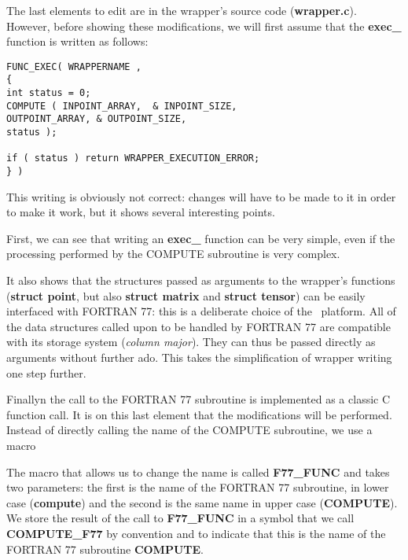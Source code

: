 The last elements to edit are in the wrapper's source code ({\bf wrapper.c}). However, before showing these modifications, we will first assume that the {\bf exec\_} function is written as follows:

\lstset{language=C++, basicstyle=\normalsize}
\begin{lstlisting}[frame=TBRL]
FUNC_EXEC( WRAPPERNAME ,
{
int status = 0;
COMPUTE ( INPOINT_ARRAY,  & INPOINT_SIZE,
OUTPOINT_ARRAY, & OUTPOINT_SIZE,
status );

if ( status ) return WRAPPER_EXECUTION_ERROR;
} )
\end{lstlisting}

This writing is obviously not correct: changes will have to be made to it in order to make it work, but it shows several interesting points.

First, we can see that writing an {\bf exec\_} function can be very simple, even if the processing performed by the COMPUTE subroutine is very complex.

It also shows that the structures passed as arguments to the wrapper's functions ({\bf struct point}, but also {\bf struct matrix} and {\bf struct tensor}) can be easily interfaced with FORTRAN 77: this is a deliberate choice of the \OT\ platform. All of the data structures called upon to be handled by FORTRAN 77 are compatible with its storage system (\emph{column major}). They can thus be passed directly as arguments without further ado. This takes the simplification of wrapper writing one step further.

Finallyn the call to the FORTRAN 77 subroutine is implemented as a classic C function call. It is on this last element that the modifications will be performed. Instead of directly calling the name of the COMPUTE subroutine, we use a macro%

The macro that allows us to change the name is called {\bf F77\_FUNC} and takes two parameters: the first is the name of the FORTRAN 77 subroutine, in lower case ({\bf compute}) and the second is the same name in upper case ({\bf COMPUTE}). We store the result of the call to {\bf F77\_FUNC} in a symbol that we call {\bf COMPUTE\_F77} by convention and to indicate that this is the name of the FORTRAN 77 subroutine {\bf COMPUTE}.

